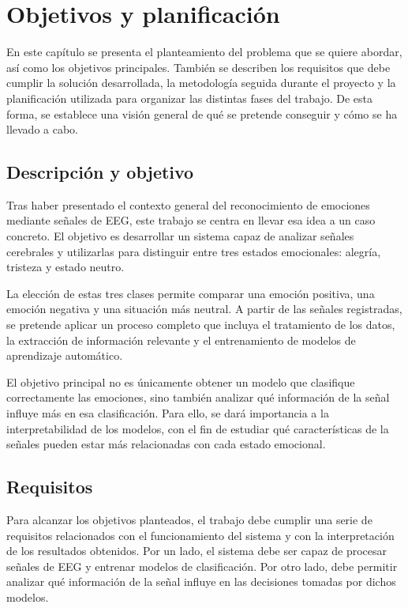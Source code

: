 
\chapter{Objetivos y planificación}
\label{cap:capitulo2}


En este capítulo se presenta el planteamiento del problema que se quiere abordar, así como los objetivos principales. También se describen los requisitos que debe cumplir la solución desarrollada, la metodología seguida durante el proyecto y la planificación utilizada para organizar las distintas fases del trabajo. De esta forma, se establece una visión general de qué se pretende conseguir y cómo se ha llevado a cabo.\\


\section{Descripción y objetivo}

Tras haber presentado el contexto general del reconocimiento de emociones mediante señales de \ac{EEG}, este trabajo se centra en llevar esa idea a un caso concreto. El objetivo es desarrollar un sistema capaz de analizar señales cerebrales y utilizarlas para distinguir entre tres estados emocionales: alegría, tristeza y estado neutro.

La elección de estas tres clases permite comparar una emoción positiva, una emoción negativa y una situación más neutral. A partir de las señales registradas, se pretende aplicar un proceso completo que incluya el tratamiento de los datos, la extracción de información relevante y el entrenamiento de modelos de aprendizaje automático.

El objetivo principal no es únicamente obtener un modelo que clasifique correctamente las emociones, sino también analizar qué información de la señal influye más en esa clasificación. Para ello, se dará importancia a la interpretabilidad de los modelos, con el fin de estudiar qué características de la señales pueden estar más relacionadas con cada estado emocional.


\section{Requisitos}

Para alcanzar los objetivos planteados, el trabajo debe cumplir una serie de requisitos relacionados con el funcionamiento del sistema y con la interpretación de los resultados obtenidos. Por un lado, el sistema debe ser capaz de procesar señales de \ac{EEG} y entrenar modelos de clasificación. Por otro lado, debe permitir analizar qué información de la señal influye en las decisiones tomadas por dichos modelos.


